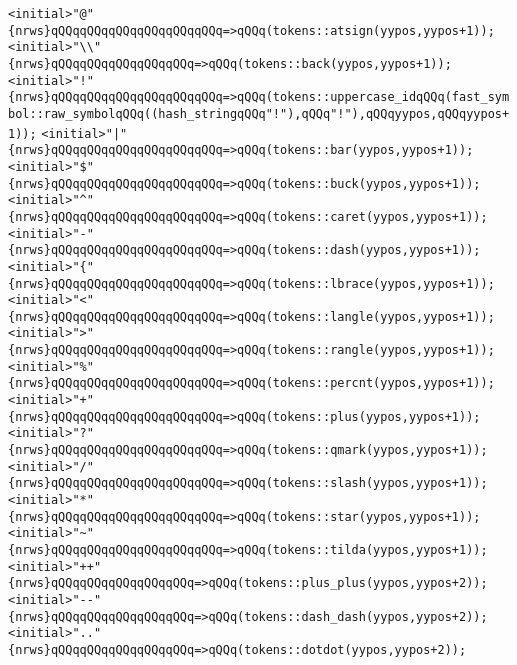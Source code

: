 \verb|<initial>"@"{nrws}qQQqqQQqqQQqqQQqqQQqqQQq=>qQQq(tokens::atsign(yypos,yypos+1));|\newline
\verb|<initial>"\\"{nrws}qQQqqQQqqQQqqQQqqQQq=>qQQq(tokens::back(yypos,yypos+1));|\newline
\verb|<initial>"!"{nrws}qQQqqQQqqQQqqQQqqQQqqQQq=>qQQq(tokens::uppercase_idqQQq(fast_symbol::raw_symbolqQQq((hash_stringqQQq"!"),qQQq"!"),qQQqyypos,qQQqyypos+1));|\newline
\verb|<initial>"|\verb#|"{nrws}qQQqqQQqqQQqqQQqqQQqqQQq=>qQQq(tokens::bar(yypos,yypos+1));#\newline
\verb|<initial>"$"{nrws}qQQqqQQqqQQqqQQqqQQqqQQq=>qQQq(tokens::buck(yypos,yypos+1));|\newline
\verb|<initial>"^"{nrws}qQQqqQQqqQQqqQQqqQQqqQQq=>qQQq(tokens::caret(yypos,yypos+1));|\newline
\verb|<initial>"-"{nrws}qQQqqQQqqQQqqQQqqQQqqQQq=>qQQq(tokens::dash(yypos,yypos+1));|\newline
\verb|<initial>"{"{nrws}qQQqqQQqqQQqqQQqqQQqqQQq=>qQQq(tokens::lbrace(yypos,yypos+1));|\newline
\verb|<initial>"<"{nrws}qQQqqQQqqQQqqQQqqQQqqQQq=>qQQq(tokens::langle(yypos,yypos+1));|\newline
\verb|<initial>">"{nrws}qQQqqQQqqQQqqQQqqQQqqQQq=>qQQq(tokens::rangle(yypos,yypos+1));|\newline
\verb|<initial>"%"{nrws}qQQqqQQqqQQqqQQqqQQqqQQq=>qQQq(tokens::percnt(yypos,yypos+1));|\newline
\verb|<initial>"+"{nrws}qQQqqQQqqQQqqQQqqQQqqQQq=>qQQq(tokens::plus(yypos,yypos+1));|\newline
\verb|<initial>"?"{nrws}qQQqqQQqqQQqqQQqqQQqqQQq=>qQQq(tokens::qmark(yypos,yypos+1));|\newline
\verb|<initial>"/"{nrws}qQQqqQQqqQQqqQQqqQQqqQQq=>qQQq(tokens::slash(yypos,yypos+1));|\newline
\verb|<initial>"*"{nrws}qQQqqQQqqQQqqQQqqQQqqQQq=>qQQq(tokens::star(yypos,yypos+1));|\newline
\verb|<initial>"~"{nrws}qQQqqQQqqQQqqQQqqQQqqQQq=>qQQq(tokens::tilda(yypos,yypos+1));|\newline
\verb|<initial>"++"{nrws}qQQqqQQqqQQqqQQqqQQq=>qQQq(tokens::plus_plus(yypos,yypos+2));|\newline
\verb|<initial>"--"{nrws}qQQqqQQqqQQqqQQqqQQq=>qQQq(tokens::dash_dash(yypos,yypos+2));|\newline
\verb|<initial>".."{nrws}qQQqqQQqqQQqqQQqqQQq=>qQQq(tokens::dotdot(yypos,yypos+2));|\newline
